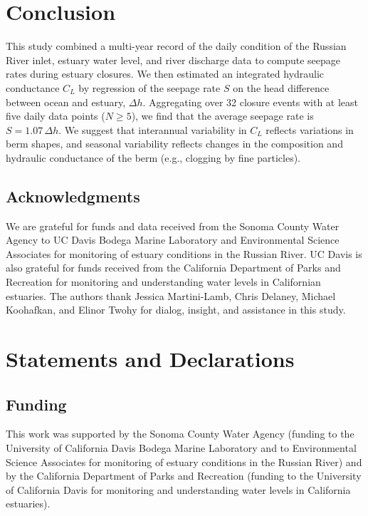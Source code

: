 \documentclass[preprint,12pt,authoryear]{elsarticle}
\begin{document}
\label{sec:discussion}

\section{Conclusion}

This study combined a multi-year record of the daily condition of the Russian River inlet, estuary water level, and river discharge data to compute seepage rates during estuary closures.
We then estimated an integrated hydraulic conductance $C_L$ by regression of the seepage rate $S$ on the head difference between ocean and estuary, $\Delta h$.
Aggregating over 32 closure events with at least five daily data points ($N \ge 5$), we find that the average seepage rate is $S = 1.07\,\Delta h$.
We suggest that interannual variability in $C_L$ reflects variations in berm shapes, and seasonal variability reflects changes in the composition and hydraulic conductance of the berm (e.g., clogging by fine particles).



\subsection*{Acknowledgments}
We are grateful for funds and data received from the Sonoma County Water Agency to UC Davis Bodega Marine Laboratory and Environmental Science Associates for monitoring of estuary conditions in the Russian River. UC Davis is also grateful for funds received from the California Department of Parks and Recreation for monitoring and understanding water levels in Californian estuaries. The authors thank Jessica Martini-Lamb, Chris Delaney, Michael Koohafkan, and Elinor Twohy for dialog, insight, and assistance in this study.

\section*{Statements and Declarations}

\subsection*{Funding}
This work was supported by the Sonoma County Water Agency (funding to the University of California Davis Bodega Marine Laboratory and to Environmental Science Associates for monitoring of estuary conditions in the Russian River) and by the California Department of Parks and Recreation (funding to the University of California Davis for monitoring and understanding water levels in California estuaries).
\end{document}
